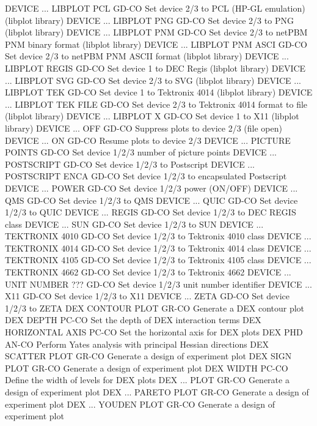 DEVICE ... LIBPLOT PCL      GD-CO Set device 2/3 to PCL (HP-GL emulation) (libplot library)
DEVICE ... LIBPLOT PNG      GD-CO Set device 2/3 to PNG (libplot library)
DEVICE ... LIBPLOT PNM      GD-CO Set device 2/3 to netPBM PNM binary format (libplot library)
DEVICE ... LIBPLOT PNM ASCI GD-CO Set device 2/3 to netPBM PNM ASCII format (libplot library)
DEVICE ... LIBPLOT REGIS    GD-CO Set device 1 to DEC Regis (libplot library)
DEVICE ... LIBPLOT SVG      GD-CO Set device 2/3 to SVG (libplot library)
DEVICE ... LIBPLOT TEK      GD-CO Set device 1 to Tektronix 4014 (libplot library)
DEVICE ... LIBPLOT TEK FILE GD-CO Set device 2/3 to Tektronix 4014 format to file (libplot library)
DEVICE ... LIBPLOT X        GD-CO Set device 1 to X11 (libplot library)
DEVICE ... OFF              GD-CO Suppress plots to device 2/3 (file open)
DEVICE ... ON               GD-CO Resume plots to device 2/3 
DEVICE ... PICTURE POINTS   GD-CO Set device 1/2/3 number of picture points
DEVICE ... POSTSCRIPT       GD-CO Set device 1/2/3 to Postscript
DEVICE ... POSTSCRIPT ENCA  GD-CO Set device 1/2/3 to encapsulated Postscript
DEVICE ... POWER            GD-CO Set device 1/2/3 power (ON/OFF)
DEVICE ... QMS              GD-CO Set device 1/2/3 to QMS
DEVICE ... QUIC             GD-CO Set device 1/2/3 to QUIC
DEVICE ... REGIS            GD-CO Set device 1/2/3 to DEC REGIS class
DEVICE ... SUN              GD-CO Set device 1/2/3 to SUN
DEVICE ... TEKTRONIX 4010   GD-CO Set device 1/2/3 to Tektronix 4010 class
DEVICE ... TEKTRONIX 4014   GD-CO Set device 1/2/3 to Tektronix 4014 class
DEVICE ... TEKTRONIX 4105   GD-CO Set device 1/2/3 to Tektronix 4105 class
DEVICE ... TEKTRONIX 4662   GD-CO Set device 1/2/3 to Tektronix 4662
DEVICE ... UNIT NUMBER ???  GD-CO Set device 1/2/3 unit number identifier
DEVICE ... X11              GD-CO Set device 1/2/3 to X11
DEVICE ... ZETA             GD-CO Set device 1/2/3 to ZETA
DEX CONTOUR PLOT            GR-CO Generate a DEX contour plot
DEX DEPTH                   PC-CO Set the depth of DEX interaction terms
DEX HORIZONTAL AXIS         PC-CO Set the horizontal axis for DEX plots
DEX PHD                     AN-CO Perform Yates analysis with principal Hessian directions
DEX SCATTER PLOT            GR-CO Generate a design of experiment plot
DEX SIGN PLOT               GR-CO Generate a design of experiment plot
DEX WIDTH                   PC-CO Define the width of levels for DEX plots
DEX ... PLOT                GR-CO Generate a design of experiment plot
DEX ... PARETO PLOT         GR-CO Generate a design of experiment plot
DEX ... YOUDEN PLOT         GR-CO Generate a design of experiment plot
